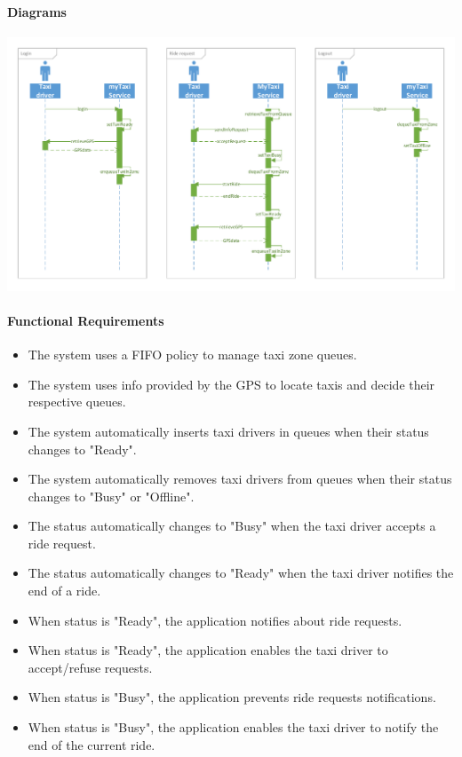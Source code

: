 	\paragraph{Diagrams}
		\begin{center}
			\includegraphics[width=\textwidth]{diagrams/availability}
		\end{center}
		
	\paragraph{Functional Requirements}
		\begin{itemize}
			\item The system uses a FIFO policy to manage taxi zone queues.
			\item The system uses info provided by the GPS to locate taxis and decide their respective queues.
			\item The system automatically inserts taxi drivers in queues when their status changes to "Ready".
			\item The system automatically removes taxi drivers from queues when their status changes to "Busy" or "Offline".
			\item The status automatically changes to "Busy" when the taxi driver accepts a ride request.
			\item The status automatically changes to "Ready" when the taxi driver notifies the end of a ride.
			\item When status is "Ready", the application notifies about ride requests.
			\item When status is "Ready", the application enables the taxi driver to accept/refuse requests.
			\item When status is "Busy", the application prevents ride requests notifications.
			\item When status is "Busy", the application enables the taxi driver to notify the end of the current ride.
		\end{itemize}

